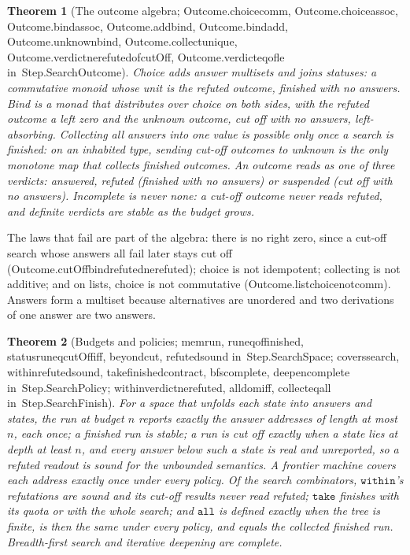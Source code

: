\documentclass[11pt]{article}
\newtheorem{theorem}{Theorem}
\theoremstyle{remark}
\newcommand{\lean}[1]{{\ttfamily\def\_{\textunderscore\allowbreak}#1}}
\newcommand{\inmod}[1]{in~{\ttfamily\def\_{\textunderscore\allowbreak}#1}}
\begin{document}
\begin{theorem}[The outcome algebra; \lean{Outcome.choice\_comm}, \lean{Outcome.choice\_assoc}, \lean{Outcome.bind\_assoc}, \lean{Outcome.add\_bind}, \lean{Outcome.bind\_add}, \lean{Outcome.unknown\_bind}, \lean{Outcome.collect\_unique}, \lean{Outcome.verdict\_ne\_refuted\_of\_cutOff}, \lean{Outcome.verdict\_eq\_of\_le} \inmod{Step.SearchOutcome}]
Choice adds answer multisets and joins statuses: a commutative monoid whose unit is the refuted
outcome, finished with no answers. Bind is a monad that distributes over choice on both sides, with the
refuted outcome a left zero and the unknown outcome, cut off with no answers, left-absorbing. Collecting
all answers into one value is possible only once a search is finished: on an inhabited type, sending
cut-off outcomes to unknown is the only monotone map that collects finished outcomes. An outcome reads
as one of three verdicts: \emph{answered}, \emph{refuted} (finished with no answers) or \emph{suspended}
(cut off with no answers). Incomplete is never none: a cut-off outcome never reads refuted, and definite
verdicts are stable as the budget grows.
\end{theorem}

The laws that fail are part of the algebra: there is no right zero, since a cut-off search whose answers
all fail later stays cut off (\lean{Outcome.cutOff\_bind\_refuted\_ne\_refuted}); choice is not idempotent;
collecting is not additive; and on lists, choice is not commutative (\lean{Outcome.list\_choice\_not\_comm}).
Answers form a multiset because alternatives are unordered and two derivations of one answer are two
answers.

\begin{theorem}[Budgets and policies; \lean{mem\_run}, \lean{run\_eq\_of\_finished}, \lean{status\_run\_eq\_cutOff\_iff}, \lean{beyond\_cut}, \lean{refuted\_sound} \inmod{Step.SearchSpace}; \lean{covers\_search}, \lean{within\_refuted\_sound}, \lean{take\_finished\_contract}, \lean{bfs\_complete}, \lean{deepen\_complete} \inmod{Step.SearchPolicy}; \lean{within\_verdict\_ne\_refuted}, \lean{all\_dom\_iff}, \lean{collect\_eq\_all} \inmod{Step.SearchFinish}]
For a space that unfolds each state into answers and states, the run at budget $n$ reports exactly the
answer addresses of length at most $n$, each once; a finished run is stable; a run is cut off exactly
when a state lies at depth at least $n$, and every answer below such a state is real and unreported, so a
refuted readout is sound for the unbounded semantics. A frontier machine covers each address exactly
once under every policy. Of the search combinators, $\mathtt{within}$'s refutations are sound and its
cut-off results never read refuted; $\mathtt{take}$ finishes with its quota or with the whole search;
and $\mathtt{all}$ is defined exactly when the tree is finite, is then the same under every policy, and
equals the collected finished run. Breadth-first search and iterative deepening are complete.
\end{theorem}
\end{document}
